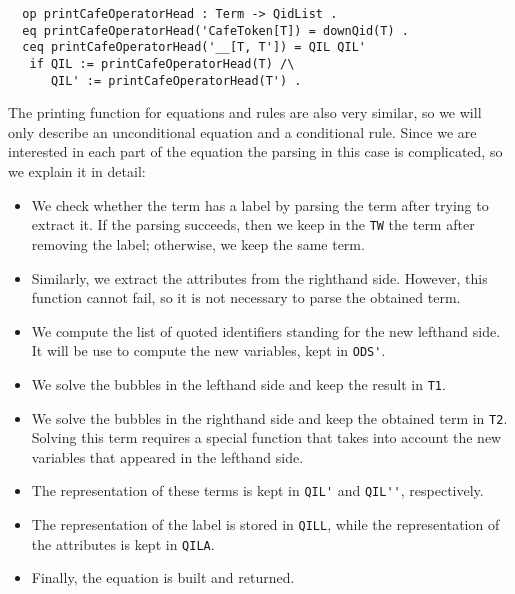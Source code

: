 {\codesize
\begin{verbatim}
  op printCafeOperatorHead : Term -> QidList .
  eq printCafeOperatorHead('CafeToken[T]) = downQid(T) .
  ceq printCafeOperatorHead('__[T, T']) = QIL QIL'
   if QIL := printCafeOperatorHead(T) /\
      QIL' := printCafeOperatorHead(T') .
\end{verbatim}
}

The printing function for equations and rules are also very similar, so we will
only describe an unconditional equation and a conditional rule. Since we are interested
in each part of the equation the parsing in this case is complicated, so we explain
it in detail:
\begin{itemize}
\item
We check whether the term has a label by parsing the term after trying to extract it.
If the parsing succeeds, then we keep in the \texttt{TW} the term after removing the
label; otherwise, we keep the same term.

\item
Similarly, we extract the attributes from the righthand side. However, this function
cannot fail, so it is not necessary to parse the obtained term.

\item
We compute the list of quoted identifiers standing for the new lefthand side. It will
be use to compute the new variables, kept in \verb"ODS'".

\item
We solve the bubbles in the lefthand side and keep the result in \verb"T1".

\item
We solve the bubbles in the righthand side and keep the obtained term in \verb"T2".
Solving this term requires a special function that takes into account the new
variables that appeared in the lefthand side.

\item
The representation of these terms is kept in \verb"QIL'" and \verb"QIL''", respectively.

\item
The representation of the label is stored in \verb"QILL", while the representation of
the attributes is kept in \verb"QILA".

\item
Finally, the equation is built and returned.

\end{itemize}



